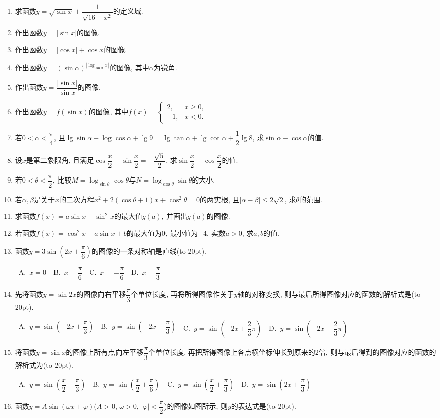 \documentclass[10pt,a4paper]{article}
\newcommand{\bracket}[1]{(\hbox to #1pt{})}
\newcommand{\fourch}[4]{\par\begin{tabular}{p{.23\textwidth}p{.23\textwidth}p{.23\textwidth}p{.23\textwidth}}
A.~#1 &B.~#2& C.~#3& D.~#4
\end{tabular}}
\begin{document}
\begin{enumerate}[1.]
\item 求函数$y=\sqrt {\sin x}+\dfrac 1{\sqrt {16-x^2}}$的定义域.
\item 作出函数$y=|\sin x|$的图像.
\item 作出函数$y=|\cos x|+\cos x$的图像.
\item 作出函数$y=(\sin \alpha)^{|\log _{\sin \alpha}x|}$的图像, 其中$\alpha$为锐角.
\item 作出函数$y=\dfrac{|\sin x|}{\sin x}$的图像.
\item 作出函数$y=f(\sin x)$的图像, 其中$f(x)=\begin{cases}
    2, &  x\ge 0,  \\ -1, & x<0. \end{cases}$
\item 若$0<\alpha <\dfrac{\pi}4$, 且$\lg \sin \alpha +\log \cos \alpha +\lg 9=\lg \tan \alpha +\lg \cot \alpha +\dfrac 12\lg 8$, 求$\sin \alpha -\cos \alpha$的值.
\item 设$x$是第二象限角, 且满足$\cos \dfrac x2+\sin \dfrac x2=-\dfrac{\sqrt 5}2$, 求$\sin \dfrac x2-\cos \dfrac x2$的值.
\item 若$0<\theta <\dfrac{\pi}2$, 比较$M=\log _{\sin \theta}\cos \theta$与$N=\log _{\cos \theta}\sin \theta$的大小.
\item 若$\alpha ,\beta$是关于$x$的二次方程$x^2+2(\cos \theta +1)x+\cos ^2\theta =0$的两实根, 且$|\alpha -\beta|\le 2\sqrt 2$, 求$\theta$的范围.
\item 求函数$f(x)=a\sin x-\sin ^2x$的最大值$g(a)$, 并画出$g(a)$的图像.
\item 若函数$f(x)=\cos ^2x-a\sin x+b$的最大值为$0$, 最小值为$-4$, 实数$a>0$, 求$a,b$的值.
\item 函数$y=3\sin (2x+\dfrac{\pi}6)$的图像的一条对称轴是直线\bracket{20}.
\fourch{$x=0$}{$x=\dfrac{\pi}6$}{$x=-\dfrac{\pi}6$}{$x=\dfrac{\pi}3$}
\item 先将函数$y=\sin 2x$的图像向右平移$\dfrac{\pi}3$个单位长度, 再将所得图像作关于$y$轴的对称变换, 则与最后所得图像对应的函数的解析式是\bracket{20}.
\fourch{$y=\sin (-2x+\dfrac{\pi}3)$}{$y=\sin (-2x-\dfrac{\pi}3)$}{$y=\sin (-2x+\dfrac 23\pi)$}{$y=\sin (-2x-\dfrac 23\pi)$}
\item 将函数$y=\sin x$的图像上所有点向左平移$\dfrac{\pi}3$个单位长度, 再把所得图像上各点横坐标伸长到原来的2倍, 则与最后得到的图像对应的函数的解析式为\bracket{20}.
\fourch{$y=\sin (\dfrac x2-\dfrac{\pi}3)$}{$y=\sin (\dfrac x2+\dfrac{\pi}6)$}{$y=\sin (\dfrac x2+\dfrac{\pi}3)$}{$y=\sin (2x+\dfrac{\pi}3)$}
\item 函数$y=A\sin (\omega x+\varphi)$($A>0$, $\omega >0$, $|\varphi|<\dfrac{\pi}2$)的图像如图所示, 则$y$的表达式是\bracket{20}.

\end{enumerate}
\end{document}
